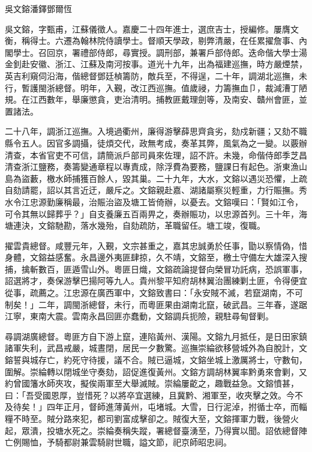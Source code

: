 
\begin{pinyinscope}
吳文鎔潘鐸鄧爾恆

吳文鎔，字甄甫，江蘇儀徵人。嘉慶二十四年進士，選庶吉士，授編修。屢膺文衡，稱得士。六遷為翰林院侍讀學士。督順天學政，剔弊清嚴，在任累擢詹事、內閣學士。召回京，署禮部侍郎，尋實授。調刑部，兼署戶部侍郎。迭命偕大學士湯金釗赴安徽、浙江、江蘇及南河按事。道光十九年，出為福建巡撫，時方嚴煙禁，英吉利窺伺沿海，偕總督鄧廷楨籌防，敵兵至，不得逞，二十年，調湖北巡撫，未行，暫護閩浙總督。明年，入覲，改江西巡撫。值歲祲，力籌撫血⼙，裁減漕丁陋規。在江西數年，舉廉懲貪，吏治清明。捕教匪戴理劍等，及南安、贛州會匪，並置諸法。

二十八年，調浙江巡撫。入境過衢州，廉得游擊薛思齊貪劣，劾戍新疆；又劾不職縣令五人。因官多調攝，徒煩交代，政無考成，奏革其弊，風氣為之一變。以覈辦清查，本省官吏不可信，請簡派戶部司員來佐理，詔不許。未幾，命偕侍郎季芝昌清查浙江鹽務，奏籌變通章程以專責成，除浮費為要務，鹽課日有起色。浙東漁山島為盜藪，檄水師捕獲百餘人，毀其巢。二十九年，大水，文鎔以遇災恐懼，上疏自劾請罷，詔以其言近迂，嚴斥之。文鎔親赴嘉、湖諸屬察災輕重，力行賑撫。秀水令江忠源勤廉稱最，治賑治盜及塘工皆倚辦，以憂去。文鎔嘆曰：「賢如江令，可令其無以歸葬乎？」自支養廉五百兩畀之，奏辦賑功，以忠源首列。三十年，海塘連決，文鎔馳勘，落水幾殆，自劾疏防，革職留任。塘工竣，復職。

擢雲貴總督。咸豐元年，入覲，文宗甚重之，嘉其忠誠勇於任事，勖以察情偽，惜身體，文鎔益感奮。永昌邊外夷匪肆掠，久不靖，文鎔至，檄土守備左大雄深入搜捕，擒斬數百，匪遁雪山外。粵匪日熾，文鎔疏論提督向榮冒功託病，恐誤軍事，詔選將才，奏保游擊巴揚阿等九人。貴州黎平知府胡林翼治團練剿土匪，令得便宜從事，疏薦之。江忠源在廣西軍中，文鎔致書曰：「永安賊不滅，若竄湖南，不可制矣！」二年，調閩浙總督，未行，而粵匪果由湖南北竄，破武昌。三年春，遂踞江寧，東南大震。雲南永昌回匪亦蠢動，文鎔調兵扼險，親駐尋甸督剿。

尋調湖廣總督。粵匪方自下游上竄，連陷黃州、漢陽。文鎔九月抵任，是日田家鎮諸軍失利，武昌戒嚴，城晝閉，居民一夕數驚。巡撫崇綸欲移營城外為自脫計，文鎔誓與城存亡，約死守待援，議不合。賊已逼城，文鎔坐城上激厲將士，守數旬，圍解。崇綸轉以閉城坐守奏劾，詔促進復黃州。文鎔方調胡林翼率黔勇來會剿，又約曾國籓水師夾攻，擬俟兩軍至大舉滅賊。崇綸屢齕之，趣戰益急。文鎔憤甚，曰：「吾受國恩厚，豈惜死？以將卒宜選練，且冀黔、湘軍至，收夾擊之效。今不及待矣！」四年正月，督師進薄黃州，屯堵城。大雪，日行泥淖，拊循士卒，而輜糧不時至。賊分路來犯，都司劉富成擊卻之。賊復大至，文鎔揮軍力戰，後營火起，眾潰，投塘水死之。崇綸奏稱失蹤，署總督臺湧至，乃得實以聞。詔依總督陣亡例賜恤，予騎都尉兼雲騎尉世職，謚文節，祀京師昭忠祠。


\end{pinyinscope}
